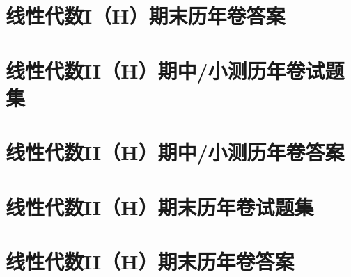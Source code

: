 \documentclass[
    geometry = 16k,
]{LALUbook}
\begin{document}
\chapter{线性代数I（H）期末历年卷答案}













\chapter{线性代数II（H）期中/小测历年卷试题集}









\chapter{线性代数II（H）期中/小测历年卷答案}









\chapter{线性代数II（H）期末历年卷试题集}





\chapter{线性代数II（H）期末历年卷答案}





\backmatter
\end{document}
